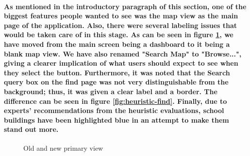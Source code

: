 \documentclass{report}
\begin{document}
    \paragraph{As mentioned in the introductory paragraph of this section, one
    of the biggest features people wanted to see was the map view as the main page
    of the application. Also, there were several labeling issues that would be taken
    care of in this stage. As can be seen in figure \ref{fig:heuristic-primary}, we have moved from the
    main screen being a dashboard to it being a blank map view. We have also renamed
    "Search Map" to "Browse...", giving a clearer implication of what users should
    expect to see when they select the button. Furthermore, it was noted that the
    Search query box on the find page was not very distinguishable from the
    background; thus, it was given a clear label and a border. The difference can be
    seen in figure \ref{fig:heuristic-find}. Finally, due to experts' recommendations from the
    heuristic evaluations, school buildings have been highlighted blue in an attempt
    to make them stand out more.}
    \begin{figure}
    \centering
    \caption{Old and new primary view}
    \label{fig:heuristic-primary}
    \end{figure}
\end{document}
